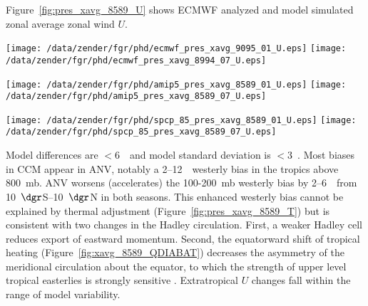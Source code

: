 \documentclass[agums]{aguplus}
\begin{document}
Figure~\ref{fig:pres_xavg_8589_U} shows ECMWF analyzed and model
simulated zonal average zonal wind $U$.
\begin{figure*}
\begin{center}
\texttt{[image: /data/zender/fgr/phd/ecmwf\_pres\_xavg\_9095\_01\_U.eps]}%
\texttt{[image: /data/zender/fgr/phd/ecmwf\_pres\_xavg\_8994\_07\_U.eps]}%

\texttt{[image: /data/zender/fgr/phd/amip5\_pres\_xavg\_8589\_01\_U.eps]}%
\texttt{[image: /data/zender/fgr/phd/amip5\_pres\_xavg\_8589\_07\_U.eps]}%

\texttt{[image: /data/zender/fgr/phd/spcp\_85\_pres\_xavg\_8589\_01\_U.eps]}%
\texttt{[image: /data/zender/fgr/phd/spcp\_85\_pres\_xavg\_8589\_07\_U.eps]}%
\end{center}
\caption[Zonal average zonal wind $U$ for January and July ECMWF, CCM,
and ANV]{ 
Zonal average zonal wind $U$ (\mxs) for (left) January and
(right) July (a,b) 1989--1994 ECMWF, (c,d) 1985--1989 CCM, and (e,f)
1985--1989 ANV.  
Contour interval is 5~\mxs.
Shading indicates easterly zonal winds ($U < 0$).
\label{fig:pres_xavg_8589_U}}
\end{figure*}
Model differences are $< 6$~\mxs\ and model standard deviation is  
$< 3$~\mxs.
Most biases in CCM appear in ANV, notably a 2--12~\mxs\ westerly bias
in the tropics above 800~mb.
ANV worsens (accelerates) the 100-200~mb westerly bias by 2--6~\mxs\
from 10~$\dgr$S--10~$\dgr$N in both seasons. 
This enhanced westerly bias cannot be explained by thermal adjustment 
(Figure~\ref{fig:pres_xavg_8589_T}) but is consistent with two changes
in the Hadley circulation.
First, a weaker Hadley cell reduces export of eastward momentum. 
Second, the equatorward shift of tropical heating
(Figure~\ref{fig:xavg_8589_QDIABAT}) decreases the asymmetry of the
meridional circulation about the equator, to which the strength of
upper level tropical easterlies is strongly sensitive \cite[]{LiH88}.
Extratropical $U$ changes fall within the range of model variability.


\end{document}
